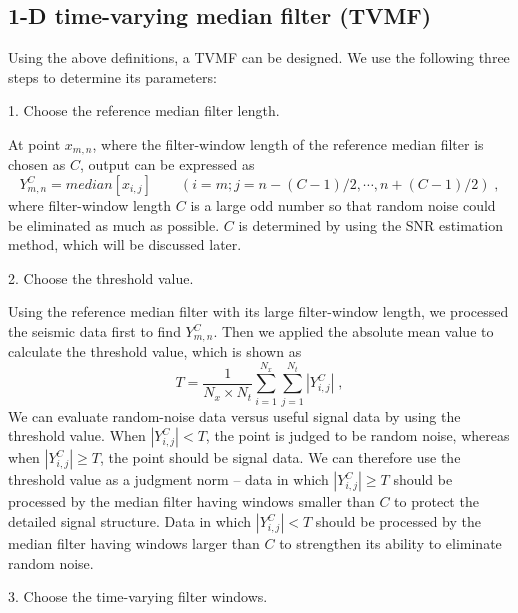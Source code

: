  \subsection{1-D time-varying median filter (TVMF)}

Using the above definitions, a TVMF can be designed. We use the following three steps to determine its parameters:

1. Choose the reference median filter length.

At point $x_{m,n}$, where the filter-window length of the reference 
median filter is chosen as $C$, output can be expressed as
      \begin{equation}
        \label{eq:eq2}
          Y_{m,n}^C = median[x_{i,j}] \qquad (i=m;j=n-(C-1)/2,\cdots,n+(C-1)/2)\;,
      \end{equation}
where filter-window length $C$ is a large odd number 
so that random noise could be eliminated as much as possible. $C$ is determined 
by using the SNR estimation method, which will be discussed later.

2. Choose the threshold value.

Using the reference median filter with its large filter-window length, we processed 
the seismic data first to find $Y_{m,n}^C$. Then we applied the absolute mean value 
to calculate the threshold value, which is shown as
      \begin{equation}
        \label{eq:eq3}
          T = \frac{1}{N_x \times N_t} \sum_{i=1}^{N_x}\! \sum_{j=1}^{N_t}|Y_{i,j}^C|\;,
      \end{equation}
We can evaluate random-noise data versus useful signal data by using the threshold 
value. When $|Y_{i,j}^C|< T$, the point is judged to be random noise, whereas when 
$|Y_{i,j}^C|\ge T$, the point should be signal data. We can therefore use the 
threshold value as a judgment norm -- data in which $|Y_{i,j}^C|\ge T$ should be 
processed by the median filter having windows smaller than $C$ to protect the 
detailed signal structure. Data in which $|Y_{i,j}^C|< T$ should be processed 
by the median filter having windows larger than $C$ to strengthen its ability to 
eliminate random noise.

3. Choose the time-varying filter windows.

